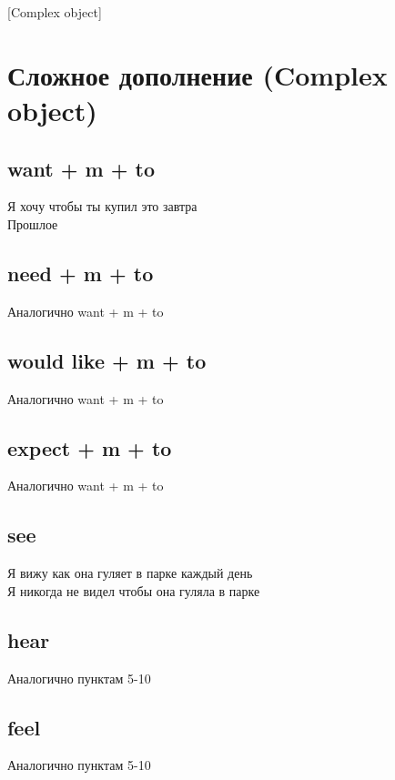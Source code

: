 [Complex object]

\section{Сложное дополнение (Complex object)}
\subsection{want + m + to}
\p
Я хочу чтобы ты купил это завтра\\
Прошлое\\

\subsection{need + m + to}
\p
Аналогично want + m + to

\subsection{would like + m + to}
\p
Аналогично want + m + to

\subsection{expect + m + to}
\p
Аналогично want + m + to\\

\subsection{see}
\p
Я вижу как она гуляет в парке каждый день\\
Я никогда не видел чтобы она гуляла в парке\\

\subsection{hear}
\p
Аналогично пунктам 5-10

\subsection{feel}
\p
Аналогично пунктам 5-10

